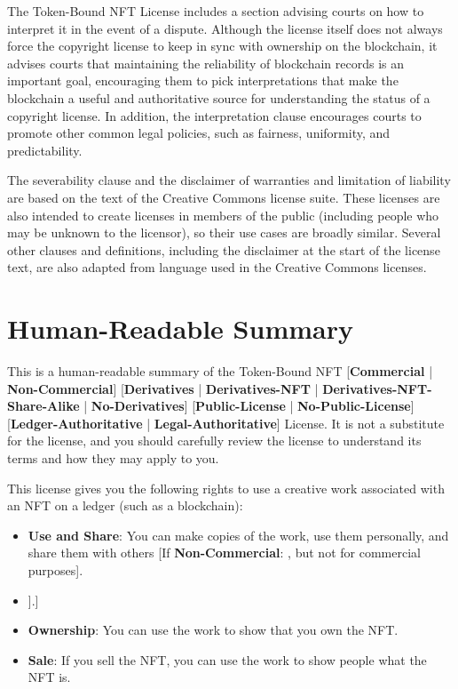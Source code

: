 \documentclass{article}
\newcommand{\iccclicense}{Token-Bound NFT License\xspace}
\newcommand{\keyword}[1]{\textbf{#1}\xspace}
\newcommand{\publiclicense}{\keyword{Public-License}}
\newcommand{\nopubliclicense}{\keyword{No-Public-License}}
\newcommand{\commercial}{\keyword{Commercial}}
\newcommand{\noncommercial}{\keyword{Non-Commercial}}
\newcommand{\noderivative}{\keyword{No-Derivatives}}
\newcommand{\derivative}{\keyword{Derivatives}}
\newcommand{\derivativetracking}{\keyword{Derivatives-NFT}}
\newcommand{\sharealike}{\keyword{Derivatives-NFT-Share-Alike}}
\newcommand{\ledger}{\keyword{Ledger-Authoritative}}
\newcommand{\legal}{\keyword{Legal-Authoritative}}
\newcommand{\iflicenseoption}[2]{[\colorbox{light-gray}{If #1:} #2]}
\newcommand{\ifnotlicenseoption}[2]{[\colorbox{light-gray}{Unless #1:} #2]}
\begin{document}
The \iccclicense includes a section advising courts on how to interpret it in the event of a dispute. Although the license itself does not always force the copyright license to keep in sync with ownership on the blockchain, it advises courts that maintaining the reliability of blockchain records is an important goal, encouraging them to pick interpretations that make the blockchain a useful and authoritative source for understanding the status of a copyright license. In addition, the interpretation clause encourages courts to promote other common legal policies, such as fairness, uniformity, and predictability.

The severability clause and the disclaimer of warranties and limitation of liability are based on the text of the Creative Commons license suite. These licenses are also intended to create licenses in members of the public (including people who may be unknown to the licensor), so their use cases are broadly similar. Several other clauses and definitions, including the disclaimer at the start of the license text, are also adapted from language used in the Creative Commons licenses.

\appendix

\section{Human-Readable Summary}
\label{sec:human}

This is a human-readable summary of the Token-Bound NFT [\commercial{} | \noncommercial{}] [\derivative{} | \derivativetracking{} | \sharealike{} | \noderivative{}]  [\publiclicense{} | \nopubliclicense{}] [\ledger{} | \legal{}] License. It is not a substitute for the license, and you should carefully review the license to understand its terms and how they may apply to you.

This license gives you the following rights to use a creative work associated with an NFT on a ledger (such as a blockchain): 

\begin{itemize}
\item \textbf{Use and Share}: You can make copies of the work, use them personally, and share them with others \iflicenseoption{\noncommercial}{, but not for commercial purposes}.
\item \ifnotlicenseoption{\noderivative}{\textbf{Derivatives}: you can make new works that include and build on the work, use them, and share them with others \iflicenseoption{\noncommercial}{, but not for commercial purposes} \iflicenseoption{\derivativetracking}{, provided that you also release them as NFTs using the same technical standard and on the same ledger as the original NFT \iflicenseoption{\sharealike}{under the same license}}.}
\item \textbf{Ownership}: You can use the work to show that you own the NFT.
\item \textbf{Sale}: If you sell the NFT, you can use the work to show people what the NFT is.
\end{itemize}
\end{document}
